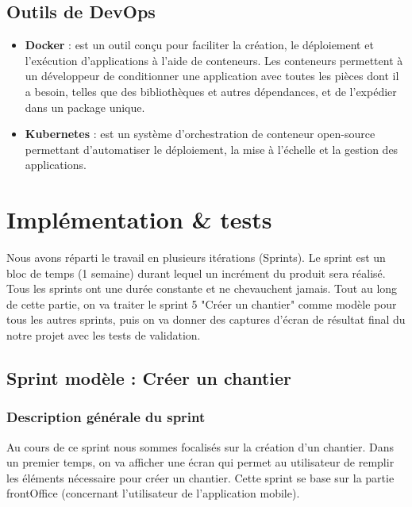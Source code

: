 \subsection{Outils de DevOps}

\begin{itemize}
\item \textbf{Docker} : est un outil con\c{c}u pour faciliter la cr\'eation, le d\'eploiement et l'ex\'ecution d'applications \`a l'aide de conteneurs. Les conteneurs permettent \`a un d\'eveloppeur de conditionner une application avec toutes les pi\`eces dont il a besoin, telles que des biblioth\`eques et autres d\'ependances, et de l'exp\'edier dans un package unique.

\item \textbf{Kubernetes} : est un syst\`eme d'orchestration de conteneur open-source permettant d'automatiser le d\'eploiement, la mise \`a l'\'echelle et la gestion des applications.

\end{itemize}

\section{Impl\'ementation \& tests}

Nous avons r\'eparti le travail en plusieurs it\'erations (Sprints). Le sprint est un bloc de temps (1 semaine) durant lequel un incr\'ement du produit sera r\'ealis\'e. Tous les sprints ont une dur\'ee constante et ne chevauchent jamais. Tout au long de cette partie, on va traiter le sprint 5 "Cr\'eer un chantier" comme mod\`ele pour tous les autres sprints, puis on va donner des captures d'\'ecran de r\'esultat final du notre projet avec les tests de validation.

\subsection{Sprint mod\`ele : Cr\'eer un chantier}

\subsubsection{Description g\'en\'erale du sprint}

Au cours de ce sprint nous sommes focalis\'es sur la cr\'eation d'un chantier. Dans un premier temps, on va afficher une \'ecran qui permet au utilisateur de remplir les \'el\'ements n\'ecessaire pour cr\'eer un chantier. Cette sprint se base sur la partie frontOffice (concernant l'utilisateur de l'application mobile).

